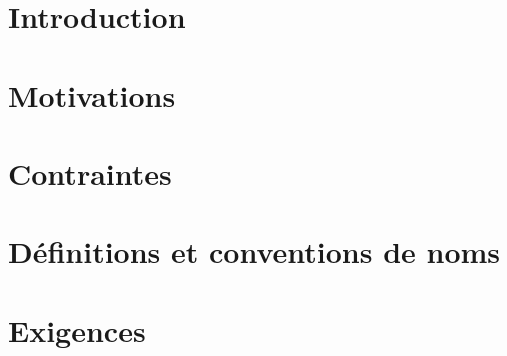 



\pagestyle{fancy} 






\tableofcontents
{}


\chapter{Introduction}


\chapter{Motivations}


\chapter{Contraintes}


\chapter{Définitions et conventions de noms}


\chapter{Exigences}




\pagestyle{fancy} 










